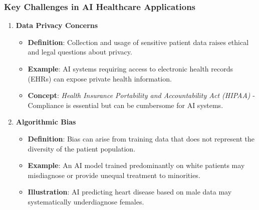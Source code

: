 \documentclass[aspectratio=169]{beamer}
\begin{document}
\begin{frame}[fragile]
    \frametitle{Key Challenges in AI Healthcare Applications}
    \begin{enumerate}
        \item \textbf{Data Privacy Concerns}
            \begin{itemize}
                \item \textbf{Definition}: Collection and usage of sensitive patient data raises ethical and legal questions about privacy.
                \item \textbf{Example}: AI systems requiring access to electronic health records (EHRs) can expose private health information.
                \item \textbf{Concept}: \textit{Health Insurance Portability and Accountability Act (HIPAA)} - Compliance is essential but can be cumbersome for AI systems.
            \end{itemize}
        
        \item \textbf{Algorithmic Bias}
            \begin{itemize}
                \item \textbf{Definition}: Bias can arise from training data that does not represent the diversity of the patient population.
                \item \textbf{Example}: An AI model trained predominantly on white patients may misdiagnose or provide unequal treatment to minorities.
                \item \textbf{Illustration}: AI predicting heart disease based on male data may systematically underdiagnose females.
            \end{itemize}
    \end{enumerate}
\end{frame}
\end{document}
